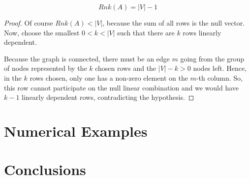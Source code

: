 \documentclass{comjnl}
\begin{document}
\begin{theorem}[Rank of A]
$$Rnk(A)=|V|-1$$
\end{theorem}
\begin{proof}
Of course $Rnk(A)<|V|$, because the sum of all rows is the null vector. Now, choose the smallest $0<k<|V|$ such that there are $k$ rows linearly dependent.

Because the graph is connected, there must be an edge $m$ going from the group of nodes represented by the $k$ chosen rows and the $|V|-k>0$ nodes left. Hence, in the $k$ rows chosen, only one has a non-zero element on the $m$-th column. So, this row cannot participate on the null linear combination and we would have $k-1$ linearly dependent rows, contradicting the hypothesis.
\end{proof}


\begin{theorem}

\end{theorem}




\section{Numerical Examples}


\section{Conclusions}
\label{Conclusions}


\nocite{*}



\end{document}
